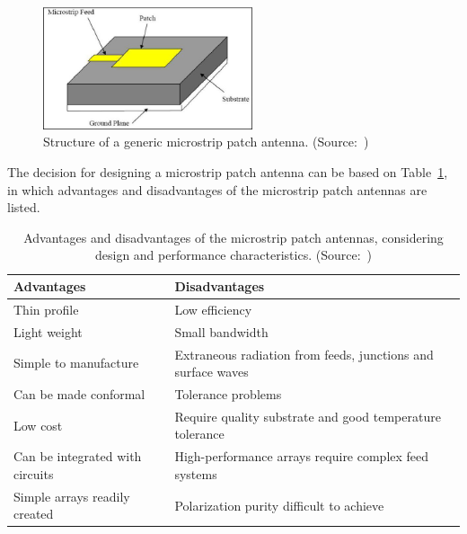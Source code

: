 \documentclass[12pt, oneandhalf, chaparabic, sees, ms]{metu}
\begin{document}
\vspace{2.0cm}

%
\begin{figure}[!htbp]
 \begin{center}
  \includegraphics[width=0.55\textwidth]{patch.png}
 \end{center}
 \caption{Structure of a generic microstrip patch antenna. (Source:~\protect\cite{khaleel2012})}
  \label{fig:patch}
\end{figure}
% 
%
%

\newpage
The decision for designing a microstrip patch antenna can be based on Table~\ref{tab:adv-dis-mspa}, in which advantages and disadvantages
of the microstrip patch antennas are listed.
\vspace{1.0cm}

\renewcommand{\arraystretch}{1.2}%
\begin{table}[H]
\begin{center}
\caption{Advantages and disadvantages of the microstrip patch antennas, considering design and performance characteristics. (Source:~\protect\cite[p.~6]{james1989})}
\label{tab:adv-dis-mspa}
\begin{adjustbox}{max width=\textwidth}
\begin{tabular}{| >{}m{2in} || >{}m{4in}|}
\hline
\rowcolor{lightgray}
\textbf{Advantages} & \textbf{Disadvantages} \tabularnewline
\hline \hline 
Thin profile                     &  Low efficiency     \tabularnewline \hline
Light weight                     &  Small bandwidth     \tabularnewline \hline
Simple to manufacture            &  Extraneous radiation from feeds, junctions and surface waves      \tabularnewline \hline
Can be made conformal            &  Tolerance problems     \tabularnewline \hline
Low cost                         &  Require quality substrate and good temperature tolerance     \tabularnewline \hline
Can be integrated with circuits  &  High-performance arrays require complex  feed systems     \tabularnewline \hline
Simple arrays readily created    &  Polarization purity difficult to achieve     \tabularnewline \hline
\end{tabular}
\end{adjustbox}
\end{center}
\end{table}
\renewcommand{\arraystretch}{1}%
\end{document}
